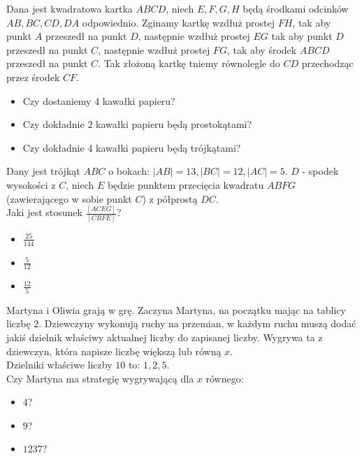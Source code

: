 \documentclass[12pt, a4paper]{article}
\newcommand{\question}[1]{\normalitem \begin{samepage}#1 \end{samepage}}
\newcommand{\questionwithasterix}[1]{ \asterixitem \begin{samepage}#1 \vspace{6cm}\end{samepage}}
\newcommand{\cmark}{\textcolor{green}{T}}%
\newcommand{\xmark}{\textcolor{red}{N}}%
\newcommand{\yes}{\rlap{\framebox(15,15)} {\raisebox{2pt}{\large\hspace{-1pt}\cmark}}%
\hspace{3pt}}
\newcommand{\no}{\rlap{\framebox(15,15)} {\raisebox{2pt}{\large\hspace{-1pt}\xmark}}%
\hspace{3pt}}
\begin{document}
\begin{enumerate}
    \question {
        Dana jest kwadratowa kartka $ABCD$, niech $E, F, G, H$ będą środkami odcinków $AB, BC, CD, DA$ odpowiednio.
        Zginamy kartkę wzdłuż prostej $FH$, tak aby punkt $A$ przeszedł na punkt $D$, następnie wzdłuż prostej $EG$ tak aby punkt $D$ przeszedł na punkt $C$, następnie wzdłuż prostej $FG$, tak aby środek $ABCD$ przeszedł na punkt $C$. Tak złożoną kartkę tniemy równolegle do $CD$ przechodząc przez środek $CF$.

		\begin{itemize}
			\item [\no]Czy dostaniemy $4$ kawałki papieru?
			\item [\yes]Czy dokładnie $2$ kawałki papieru będą prostokątami?
			\item [\no]Czy dokładnie 4 kawałki papieru będą trójkątami?
		\end{itemize}
	}
	
	\questionwithasterix {
		Dany jest trójkąt $ABC$ o bokach: $|AB| = 13, |BC| = 12, |AC| = 5$. 
        $D$ - spodek wysokości z $C$, niech $E$ będzie punktem przecięcia kwadratu $ABFG$ (zawierającego w sobie punkt $C$) z półprostą $DC$. \\
        Jaki jest stosunek $\frac{[ACEG]}{[CBFE]}$?

		\begin{itemize}
			\item [\yes]$\frac{25}{144}$
			\item [\no]$\frac{5}{12}$
			\item [\no]$\frac{12}{5}$
		\end{itemize}
	}
	
	\questionwithasterix{
		Martyna i Oliwia grają w grę.
        Zaczyna Martyna, na początku mając na tablicy liczbę $2$. Dziewczyny wykonują ruchy na przemian, w każdym ruchu muszą dodać jakiś dzielnik właściwy aktualnej liczby do zapisanej liczby. Wygrywa ta z dziewczyn, która napisze liczbę większą lub równą $x$. \\
        Dzielniki właściwe liczby $10$ to: $1, 2, 5$. \\
        Czy Martyna ma strategię wygrywającą dla $x$ równego:

		\begin{itemize}
			\item [\no]$4$?
			\item [\yes]$9$?
			\item [\yes]$1237$?
		\end{itemize}
	}
	

\end{enumerate}
\end{document}
